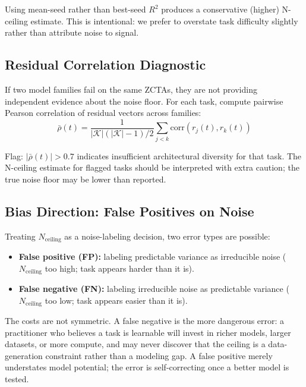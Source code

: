 \documentclass{article}
\begin{document}
Using mean-seed rather than best-seed $R^2$ produces a conservative (higher) N-ceiling estimate. This is intentional: we prefer to overstate task difficulty slightly rather than attribute noise to signal.

\subsection{Residual Correlation Diagnostic}

If two model families fail on the same ZCTAs, they are not providing independent evidence about the noise floor. For each task, compute pairwise Pearson correlation of residual vectors across families:
\begin{equation}
\bar{\rho}(t) = \frac{1}{|\mathcal{K}|(|\mathcal{K}|-1)/2} \sum_{j < k} \text{corr}(r_j(t), r_k(t))
\end{equation}

Flag: $|\bar{\rho}(t)| > 0.7$ indicates insufficient architectural diversity for that task. The N-ceiling estimate for flagged tasks should be interpreted with extra caution; the true noise floor may be lower than reported.

\subsection{Bias Direction: False Positives on Noise}

Treating $N_{\text{ceiling}}$ as a noise-labeling decision, two error types are possible:

\begin{itemize}
\item \textbf{False positive (FP):} labeling predictable variance as irreducible noise ($N_{\text{ceiling}}$ too high; task appears harder than it is).
\item \textbf{False negative (FN):} labeling irreducible noise as predictable variance ($N_{\text{ceiling}}$ too low; task appears easier than it is).
\end{itemize}

The costs are not symmetric. A false negative is the more dangerous error: a practitioner who believes a task is learnable will invest in richer models, larger datasets, or more compute, and may never discover that the ceiling is a data-generation constraint rather than a modeling gap. A false positive merely understates model potential; the error is self-correcting once a better model is tested.
\end{document}
